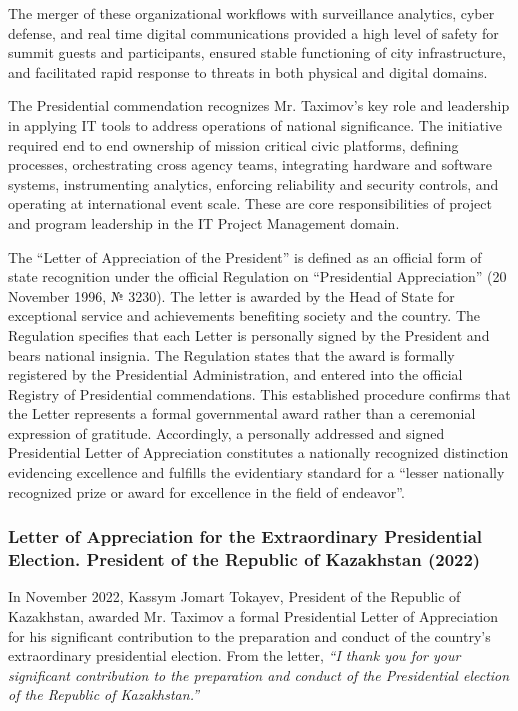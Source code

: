 The merger of these organizational workflows with surveillance analytics, cyber defense, and real time digital communications provided a high level of safety for summit guests and participants, ensured stable functioning of city infrastructure, and facilitated rapid response to threats in both physical and digital domains.

The Presidential commendation recognizes Mr. Taximov's key role and leadership in applying IT tools to address operations of national significance. The initiative required end to end ownership of mission critical civic platforms, defining processes, orchestrating cross agency teams, integrating hardware and software systems, instrumenting analytics, enforcing reliability and security controls, and operating at international event scale. These are core responsibilities of project and program leadership in the IT Project Management domain.

The ``Letter of Appreciation of the President'' is defined as an official form of state recognition under the official Regulation on ``Presidential Appreciation'' (20 November 1996, № 3230). The letter is awarded by the Head of State for exceptional service and achievements benefiting society and the country. The Regulation specifies that each Letter is personally signed by the President and bears national insignia. The Regulation states that the award is formally registered by the Presidential Administration, and entered into the official Registry of Presidential commendations. This established procedure confirms that the Letter represents a formal governmental award rather than a ceremonial expression of gratitude. Accordingly, a personally addressed and signed Presidential Letter of Appreciation constitutes a nationally recognized distinction evidencing excellence and fulfills the evidentiary standard for a ``lesser nationally recognized prize or award for excellence in the field of endeavor''.


\subsubsection{Letter of Appreciation for the Extraordinary Presidential Election. President of the Republic of Kazakhstan (2022)} 
\label{subsubsec:Awards4}

In November 2022, Kassym Jomart Tokayev, President of the Republic of Kazakhstan, awarded Mr. Taximov a formal Presidential Letter of Appreciation for his significant contribution to the preparation and conduct of the country's extraordinary presidential election. From the letter, \emph{``I thank you for your significant contribution to the preparation and conduct of the Presidential election of the Republic of Kazakhstan.''}

